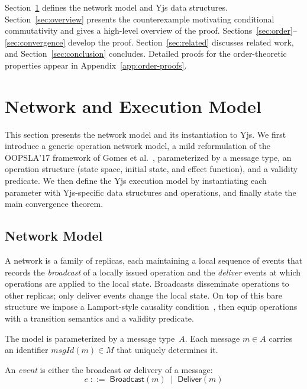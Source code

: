 \documentclass[sigplan,screen]{acmart}
\newcommand{\leanref}[1]{\texttt{#1}}
\newcommand{\bnfdef}{\;::=\;}
\newcommand{\bnfmid}{\;\mid\;}
\newcommand{\Deliver}{\mathsf{Deliver}}
\newcommand{\Broadcast}{\mathsf{Broadcast}}
\begin{document}
Section~\ref{sec:definitions} defines the network model and Yjs data
structures.
Section~\ref{sec:overview} presents the counterexample motivating
conditional commutativity and gives a high-level overview of the proof.
Sections~\ref{sec:order}--\ref{sec:convergence} develop the proof.
Section~\ref{sec:related} discusses related work, and
Section~\ref{sec:conclusion} concludes.
Detailed proofs for the order-theoretic properties appear in
Appendix~\ref{app:order-proofs}.

\section{Network and Execution Model}
\label{sec:definitions}

This section presents the network model and its instantiation to Yjs.  We
first introduce a generic operation network model, a mild reformulation of
the OOPSLA'17 framework of Gomes et al.~\cite{Gomes2017}, parameterized by
a message type, an operation structure (state space, initial state, and
effect function), and a validity predicate.  We then define the Yjs
execution model by instantiating each parameter with Yjs-specific data
structures and operations, and finally state the main convergence theorem.

\subsection{Network Model}
\label{subsec:network}

A network is a family of replicas, each maintaining a local sequence of
events that records the \emph{broadcast} of a locally issued operation and
the \emph{deliver} events at which operations are applied to the local
state.  Broadcasts disseminate operations to other replicas; only deliver
events change the local state.  On top of this bare structure we impose a
Lamport-style causality condition~\cite{Lamport1978}, then equip operations
with a transition semantics and a validity predicate.

The model is parameterized by a message type~$A$.
Each message $m \in A$ carries an identifier $\mathit{msgId}(m) \in M$
that uniquely determines it.

\begin{definition}[Event (\leanref{Event})]\label{def:event}
An \emph{event} is either the broadcast or delivery of a message:
\[
  e \bnfdef \Broadcast(m) \bnfmid \Deliver(m)
\]
\end{definition}
\end{document}
